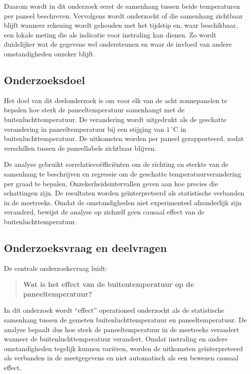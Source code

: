 \documentclass[12pt,a4paper]{article}
\begin{document}
Daarom wordt in dit onderzoek eerst de samenhang tussen beide temperaturen per paneel beschreven. Vervolgens wordt onderzocht of die samenhang zichtbaar blijft wanneer rekening wordt gehouden met het tijdstip en, waar beschikbaar, een lokale meting die als indicatie voor instraling kan dienen. Zo wordt duidelijker wat de gegevens wel ondersteunen en waar de invloed van andere omstandigheden onzeker blijft.

\subsection{Onderzoeksdoel}

Het doel van dit deelonderzoek is om voor elk van de acht zonnepanelen te bepalen hoe sterk de paneeltemperatuur samenhangt met de buitenluchttemperatuur. De verandering wordt uitgedrukt als de geschatte verandering in paneeltemperatuur bij een stijging van \(1\,^\circ\mathrm{C}\) in buitenluchttemperatuur. De uitkomsten worden per paneel gerapporteerd, zodat verschillen tussen de paneellabels zichtbaar blijven.

De analyse gebruikt correlatiecoëfficiënten om de richting en sterkte van de samenhang te beschrijven en regressie om de geschatte temperatuurverandering per graad te bepalen. Onzekerheidsintervallen geven aan hoe precies die schattingen zijn. De resultaten worden geïnterpreteerd als statistische verbanden in de meetreeks. Omdat de omstandigheden niet experimenteel afzonderlijk zijn veranderd, bewijst de analyse op zichzelf geen causaal effect van de buitenluchttemperatuur.

\subsection{Onderzoeksvraag en deelvragen}

De centrale onderzoeksvraag luidt:

\begin{quote}
\textbf{Wat is het effect van de buitentemperatuur op de paneeltemperatuur?}
\end{quote}

In dit onderzoek wordt \enquote{effect} operationeel onderzocht als de statistische samenhang tussen de gemeten buitenluchttemperatuur en paneeltemperatuur. De analyse bepaalt dus hoe sterk de paneeltemperatuur in de meetreeks verandert wanneer de buitenluchttemperatuur verandert. Omdat instraling en andere omstandigheden tegelijk kunnen variëren, worden de uitkomsten geïnterpreteerd als verbanden in de meetgegevens en niet automatisch als een bewezen causaal effect.
\end{document}
